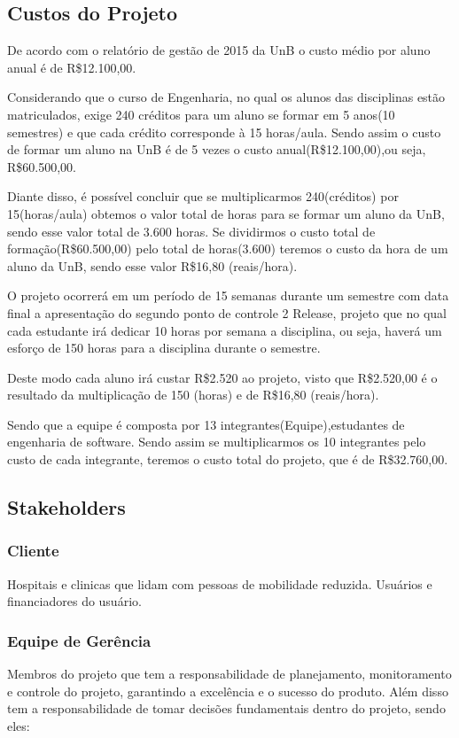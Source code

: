 \subsection{Custos do Projeto}
De acordo com o relatório de gestão de 2015 da UnB o custo médio por aluno 
anual é de R\$12.100,00.

Considerando que o curso de Engenharia, no qual os alunos das 
disciplinas estão matriculados, exige 240 créditos para um aluno se formar em 
5 anos(10 semestres) e que cada crédito corresponde à 15 
horas/aula. Sendo assim o custo de formar um aluno na UnB é de 5 
vezes o custo anual(R\$12.100,00),ou seja, R\$60.500,00.

Diante disso, é possível concluir que se multiplicarmos 240(créditos) por 
15(horas/aula) obtemos o valor total de horas para se formar um aluno da UnB,
sendo esse valor total de 3.600 horas. Se dividirmos o custo total de 
formação(R\$60.500,00) pelo total de horas(3.600) teremos o custo da hora 
de um aluno da UnB, sendo esse valor R\$16,80 (reais/hora).

O projeto ocorrerá em um período de 15 semanas durante um semestre com data 
final a apresentação do segundo ponto de controle 2 Release, projeto que no qual cada estudante irá 
dedicar 10 horas por semana a disciplina, ou seja, haverá um esforço de 150 
horas para a disciplina durante o semestre.

Deste modo cada aluno irá custar R\$2.520 ao projeto, visto que R\$2.520,00 é o 
resultado da multiplicação de 150 (horas) e de R\$16,80 (reais/hora).

Sendo que a equipe é composta por 13 integrantes(Equipe),estudantes de 
engenharia de software. Sendo assim se multiplicarmos os 10 integrantes pelo 
custo de cada integrante, teremos o custo total do projeto, que é de 
R\$32.760,00.

\subsection{Stakeholders}

\subsubsection{Cliente}
Hospitais e clinicas que lidam com pessoas de mobilidade reduzida. Usuários e financiadores do usuário.

\subsubsection{Equipe de Gerência}
Membros do projeto que tem a responsabilidade de planejamento, monitoramento 
e controle do projeto, garantindo a excelência e o sucesso do produto. Além 
disso tem a responsabilidade de tomar decisões fundamentais dentro do projeto, 
sendo eles:

